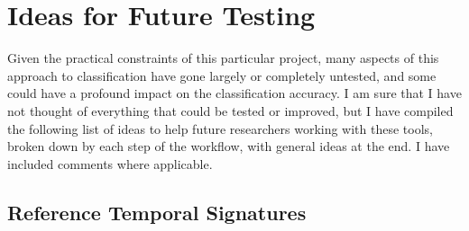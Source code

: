 \chapter{Ideas for Future Testing}

Given the practical constraints of this particular project, many aspects of this approach to classification have gone largely or completely untested, and some could have a profound impact on the classification accuracy. I am sure that I have not thought of everything that could be tested or improved, but I have compiled the following list of ideas to help future researchers working with these tools, broken down by each step of the workflow, with general ideas at the end. I have included comments where applicable.

\section{Reference Temporal Signatures}

